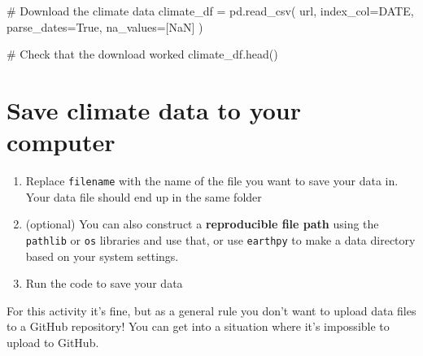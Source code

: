 \documentclass[
  letterpaper,
  DIV=11,
  numbers=noendperiod,
  oneside]{scrreprt}
\newenvironment{Shaded}{\begin{snugshade}}{\end{snugshade}}
\newcommand{\CommentTok}[1]{\textcolor[rgb]{0.37,0.37,0.37}{#1}}
\newcommand{\NormalTok}[1]{\textcolor[rgb]{0.00,0.23,0.31}{#1}}
\newcommand{\OperatorTok}[1]{\textcolor[rgb]{0.37,0.37,0.37}{#1}}
\newcommand{\StringTok}[1]{\textcolor[rgb]{0.13,0.47,0.30}{#1}}
\newcommand{\VariableTok}[1]{\textcolor[rgb]{0.07,0.07,0.07}{#1}}
\providecommand{\tightlist}{%
  \setlength{\itemsep}{0pt}\setlength{\parskip}{0pt}}
\begin{document}
\begin{Shaded}
\begin{Highlighting}[]
\CommentTok{\# Download the climate data}
\NormalTok{climate\_df }\OperatorTok{=}\NormalTok{ pd.read\_csv(}
\NormalTok{    url,}
\NormalTok{    index\_col}\OperatorTok{=}\StringTok{\textquotesingle{}DATE\textquotesingle{}}\NormalTok{,}
\NormalTok{    parse\_dates}\OperatorTok{=}\VariableTok{True}\NormalTok{,}
\NormalTok{    na\_values}\OperatorTok{=}\NormalTok{[}\StringTok{\textquotesingle{}NaN\textquotesingle{}}\NormalTok{]}
\NormalTok{)}

\CommentTok{\# Check that the download worked}
\NormalTok{climate\_df.head()}
\end{Highlighting}
\end{Shaded}

\section{Save climate data to your
computer}\label{save-climate-data-to-your-computer-1}

\begin{tcolorbox}[enhanced jigsaw, colbacktitle=quarto-callout-color!10!white, opacityback=0, bottomtitle=1mm, toptitle=1mm, bottomrule=.15mm, left=2mm, colframe=quarto-callout-color-frame, leftrule=.75mm, opacitybacktitle=0.6, colback=white, rightrule=.15mm, toprule=.15mm, breakable, titlerule=0mm, title=\textcolor{quarto-callout-color}{\faInfo}\hspace{0.5em}{Try It}, coltitle=black, arc=.35mm]

\begin{enumerate}
\def\labelenumi{\arabic{enumi}.}
\tightlist
\item
  Replace \texttt{filename} with the name of the file you want to save
  your data in. Your data file should end up in the same folder\\
\item
  (optional) You can also construct a \textbf{reproducible file path}
  using the \texttt{pathlib} or \texttt{os} libraries and use that, or
  use \texttt{earthpy} to make a data directory based on your system
  settings.
\item
  Run the code to save your data
\end{enumerate}

\end{tcolorbox}

\begin{tcolorbox}[enhanced jigsaw, colbacktitle=quarto-callout-warning-color!10!white, opacityback=0, bottomtitle=1mm, toptitle=1mm, bottomrule=.15mm, left=2mm, colframe=quarto-callout-warning-color-frame, leftrule=.75mm, opacitybacktitle=0.6, colback=white, rightrule=.15mm, toprule=.15mm, breakable, titlerule=0mm, title=\textcolor{quarto-callout-warning-color}{\faExclamationTriangle}\hspace{0.5em}{Warning}, coltitle=black, arc=.35mm]

For this activity it's fine, but as a general rule you don't want to
upload data files to a GitHub repository! You can get into a situation
where it's impossible to upload to GitHub.

\end{tcolorbox}
\end{document}
